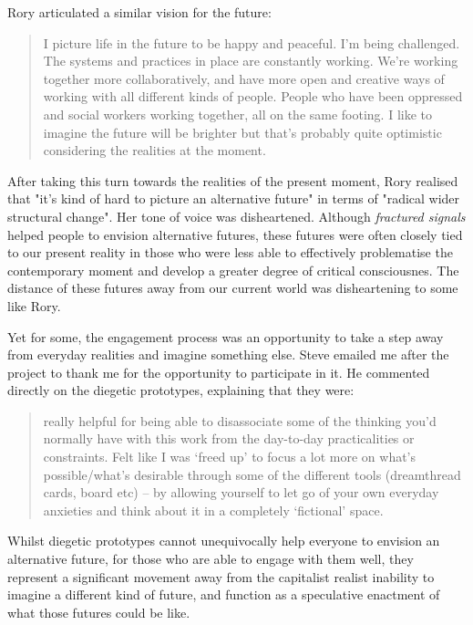 Rory articulated a similar vision for the future:
\begin{quote}
    I picture life in the future to be happy and peaceful. I'm being challenged. The systems and practices in place are constantly working. We're working together more collaboratively, and have more open and creative ways of working with all different kinds of people. People who have been oppressed and social workers working together, all on the same footing. I like to imagine the future will be brighter but that's probably quite optimistic considering the realities at the moment. 
\end{quote}
After taking this turn towards the realities of the present moment, Rory realised that "it's kind of hard to picture an alternative future" in terms of "radical wider structural change". Her tone of voice was disheartened. Although \textit{fractured signals} helped people to envision alternative futures, these futures were often closely tied to our present reality in those who were less able to effectively problematise the contemporary moment and develop a greater degree of critical consciousnes. The distance of these futures away from our current world was disheartening to some like Rory.

Yet for some, the engagement process was an opportunity to take a step away from everyday realities and imagine something else. Steve emailed me after the project to thank me for the opportunity to participate in it. He commented directly on the diegetic prototypes, explaining that they were:
\begin{quote}
really helpful for being able to disassociate some of the thinking you’d normally have with this work from the day-to-day practicalities or constraints. Felt like I was ‘freed up’ to focus a lot more on what’s possible/what’s desirable through some of the different tools (dreamthread cards, board etc) – by allowing yourself to let go of your own everyday anxieties and think about it in a completely ‘fictional’ space.
\end{quote}
Whilst diegetic prototypes cannot unequivocally help everyone to envision an alternative future, for those who are able to engage with them well, they represent a significant movement away from the capitalist realist inability to imagine a different kind of future, and function as a speculative enactment of what those futures could be like.

